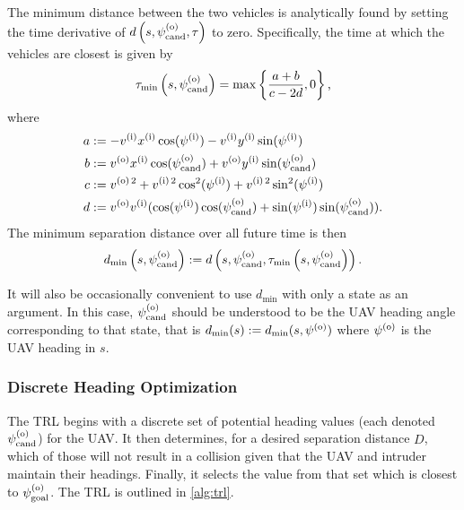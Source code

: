 The minimum distance between the two vehicles is analytically found by setting the time derivative of $d\left(s,\psi^{(\mathrm{o})}_{\mathrm{cand}}, \tau\right)$ to zero. Specifically, the time at which the vehicles are closest is given by
\begin{equation}
    \tau_\text{min}\left(s,\psi^{(\mathrm{o})}_{\mathrm{cand}}\right) = \max \left\{\frac{a + b}{c-2d}, 0\right\} \text{,}
\end{equation}
where
\begin{align*}
    a &:= -v^{(\mathrm{i})}x^{(\mathrm{i})} \cos(\psi^{(\mathrm{i})}) - v^{(\mathrm{i})} y^{(\mathrm{i})} \sin(\psi^{(\mathrm{i})}) \\
    b &:= v^{(\mathrm{o})} x^{(\mathrm{i})} \cos(\psi^{(\mathrm{o})}_{\mathrm{cand}}) + v^{(\mathrm{o})} y^{(\mathrm{i})} \sin(\psi^{(\mathrm{o})}_{\mathrm{cand}}) \\
    c &:= v^{(\mathrm{o})\,2} + v^{(\mathrm{i})\,2}\cos^2(\psi^{(\mathrm{i})}) + v^{(\mathrm{i})\,2}\sin^2(\psi^{(\mathrm{i})}) \\
    d &:= v^{(\mathrm{o})}v^{(\mathrm{i})} ( \cos(\psi^{(\mathrm{i})})\cos(\psi^{(\mathrm{o})}_{\mathrm{cand}}) + \sin(\psi^{(\mathrm{i})})\sin(\psi^{(\mathrm{o})}_{\mathrm{cand}}) ) \text{.}
\end{align*}
The minimum separation distance over all future time is then
\begin{equation}
    d_\text{min}\left(s, \psi^{(\mathrm{o})}_{\mathrm{cand}}\right) := d\left(s, \psi^{(\mathrm{o})}_{\mathrm{cand}}, \tau_\text{min}\left(s,\psi^{(\mathrm{o})}_{\mathrm{cand}}\right)\right) \text{.}
\end{equation}

It will also be occasionally convenient to use $d_\text{min}$ with only a state as an argument.
In this case, $\psi^{(\mathrm{o})}_{\mathrm{cand}}$ should be understood to be the UAV heading angle corresponding to that state, that is $d_\text{min}(s) := d_\text{min}(s, \psi^{(\mathrm{o})})$ where $\psi^{(\mathrm{o})}$ is the UAV heading in $s$.

\subsubsection{Discrete Heading Optimization}

The TRL begins with a discrete set of potential heading values (each denoted $\psi^{(\mathrm{o})}_{\mathrm{cand}}$) for the UAV. It then determines, for a desired separation distance $D$,  which of those will not result in a collision given that the UAV and  intruder maintain their headings. Finally, it selects the value from that set which is closest to $\psi^{(\mathrm{o})}_\mathrm{goal}$. The TRL is outlined in \cref{alg:trl}.

